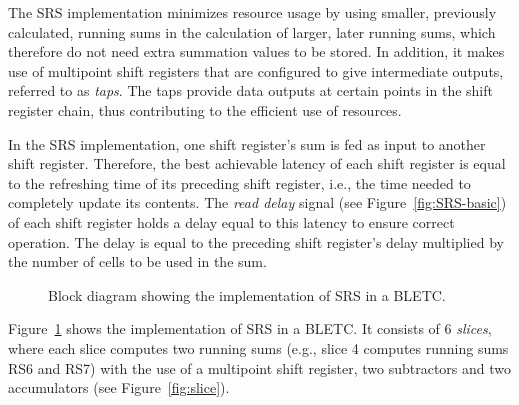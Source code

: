 \documentclass{llncs}
\begin{document}
The SRS implementation minimizes resource usage by using smaller, previously calculated, running sums in the calculation of larger, later running sums, which therefore do not need extra summation values to be stored.
In addition, it makes use of multipoint shift registers that are configured to give intermediate outputs, referred to as \emph{taps}.
The taps provide data outputs at certain points in the shift register chain, thus contributing to the efficient use of resources.

In the SRS implementation, one shift register's sum is fed as input to another shift register.
Therefore, the best achievable latency of each shift register is equal to the refreshing time of its preceding shift register, i.e., the time needed to completely update its contents.
The \emph{read delay} signal (see Figure~\ref{fig:SRS-basic}) of each shift register holds a delay equal to this latency to ensure correct operation.
The delay is equal to the preceding shift register's delay multiplied by the number of cells to be used in the sum.

\begin{figure}[t]
  \centering {}
   \caption{Block diagram showing the implementation of SRS in a BLETC.}
  \label{fig:srs}
\end{figure}

Figure~\ref{fig:srs} shows the implementation of SRS in a BLETC.
It consists of 6 \emph{slices}, where each slice computes two running sums (e.g., slice 4 computes running sums RS6 and RS7) with the use of a multipoint shift register, two subtractors and two accumulators (see Figure~\ref{fig:slice}).
\end{document}
